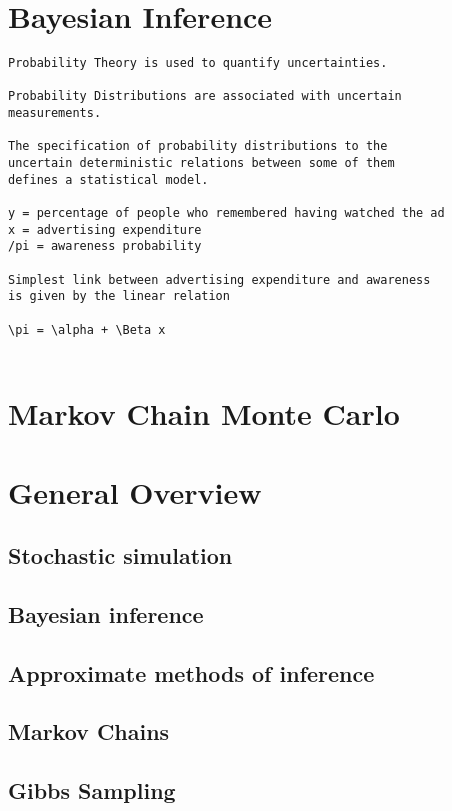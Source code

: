 \documentclass{article}
\begin{document}


\section{Bayesian Inference}
\begin{verbatim}
Probability Theory is used to quantify uncertainties.

Probability Distributions are associated with uncertain
measurements.

The specification of probability distributions to the
uncertain deterministic relations between some of them
defines a statistical model.

y = percentage of people who remembered having watched the ad
x = advertising expenditure
/pi = awareness probability

Simplest link between advertising expenditure and awareness
is given by the linear relation

\pi = \alpha + \Beta x


\end{verbatim}

\section{Markov Chain Monte Carlo}

\section{General Overview}
\subsection{Stochastic simulation}
\subsection{Bayesian inference}
\subsection{Approximate methods of inference}
\subsection{Markov Chains}
\subsection{Gibbs Sampling}
\end{document}
